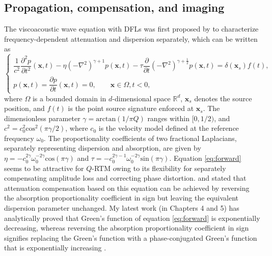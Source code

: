 \subsection{Propagation, compensation, and imaging}

The viscoacoustic wave equation with DFLs was first proposed by \cite{Zhu2014Modeling} to characterize frequency-dependent attenuation and dispersion separately, which can be written as
\begin{equation}  
\left\{  
             \begin{array}{lr}  
             \dfrac{1}{c^2}\dfrac{\partial^2p}{\partial t^2}(\mathbf{x},t)-\eta(-\nabla^2)^{\gamma+1}p(\mathbf{x},t)-\tau \dfrac{\partial}{\partial t}					
             (-\nabla^2)^{\gamma+\frac{1}{2}}p(\mathbf{x},t) = \delta(\mathbf{x}_s)f(t),  &  \\  
             p(\mathbf{x},t)=\dfrac{\partial p}{\partial t}(\mathbf{x},t)=0,   \qquad \mathbf{x} \in \Omega, t<0 , & 
             \end{array}  
\right.  
\label{eq:forward}
\end{equation} 
where $\Omega$ is a bounded domain in $d$-dimensional space $\mathbb{R}^d$, $\mathbf{x}_s$ denotes the source position, and $f(t)$ is the point source signature enforced at $\mathbf{x}_s$. The dimensionless parameter $\gamma=\mathrm{arctan}(1/\pi Q)$ ranges within $[0, 1/2)$, and $c^2=c_0^2\mathrm{cos}^2(\pi \gamma /2)$, where $c_0$ is the velocity model defined at the reference frequency $\omega_0$. The proportionality coefficients of two fractional Laplacians, separately representing dispersion and absorption, are given by $\eta =-c_0^{2\gamma}\omega_0^{-2\gamma} \mathrm{cos}(\pi \gamma)$ and $\tau=-c_0^{2\gamma-1}\omega_0^{-2\gamma}\mathrm{sin}(\pi \gamma)$. Equation \ref{eq:forward} seems to be attractive for $Q$-RTM owing to its flexibility for separately compensating amplitude loss and correcting phase distortion. \cite{Treeby2010Photoacoustic} and \cite{Zhu2014Q} stated that attenuation compensation based on this equation can be achieved by reversing the absorption proportionality coefficient in sign but leaving the equivalent dispersion parameter unchanged. My latest work (in Chapters 4 and 5) has analytically proved that Green's function of equation \ref{eq:forward} is exponentially decreasing, whereas reversing the absorption proportionality coefficient in sign signifies replacing the Green's function with a phase-conjugated Green's function that is exponentially increasing \citep{wang2018adaptive, wang2017k}. 

